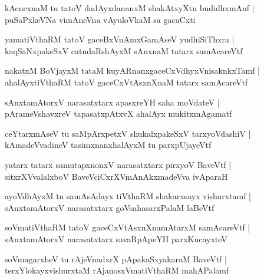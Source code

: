 \documentclass[twoside,12pt,openright]{book}
\newcounter{shloka}[chapter]
\begin{document}
\begin{shloka}
kAcncxnaM tu tatoV dadAyxdananxM shakAtxyXtu budidhxmAnf |\\
puSaPxkeVNa vimAneVna vAyuloVkaM sa gacaCxti 
\end{shloka}

\begin{shloka}
yamatiVthaRM tatoV gaceBxVnAmxGamAseV yudhiSiThxra |\\
kaqSaNxpakeSxV catudaRshAyxM sAnxnaM tatarx samAcareVtf 
\end{shloka}

\begin{shloka}
nakatxM BoVjayxM tataM kuyARnanxgaceCxVdhyxVnisaknkxTamf |\\
ahalAyxtiVthaRM tatoV gaceCxVtAsxnXnaM tatarx samAcareVtf
\end{shloka}

\begin{shloka}
sAnxtamAtorxV narasatxtarx apasxreYH saha moVdateV |\\
pArameVshavxreV tapasatxpAtxvX ahalAyx mukitxmAgamatf
\end{shloka}

\begin{shloka}
ceYtarxmAseV tu saMpArxpetxV shukalxpakeSxV tarxyoVdashiV |\\
kAmadeVvadineV tasimxnanxhalAyxM tu parxpUjayeVtf 
\end{shloka}


\begin{shloka}
yatarx tatarx samutapxnonxV narasatxtarx pirxyoV BaveVtf |\\
sitxrXVvalalxboV BaveVciCxrXVmAnAkxmadeVva ivAparaH
\end{shloka}

\begin{shloka}
ayoVdhAyxM tu samAsAdayx tiVthaRM shakarxsayx vishurxtamf |\\
sAnxtamAtorxV narasatxtarx goVsahasarxPalaM laBeVtf
\end{shloka}

\begin{shloka}
soVmatiVthaRM tatoV gaceCxVtAsxnXnamAtarxM samAcareVtf |\\
sAnxtamAtorxV narasatxtarx savaRpApeYH parxKucayxteV 
\end{shloka}

\begin{shloka}
soVmagarxheV tu rAjeVnadxrX pApakaSxyakaraM BaveVtf |\\
terxYlokayxvishurxtaM rAjanosxVmatiVthaRM mahAPalamf 
\end{shloka}
\end{document}
